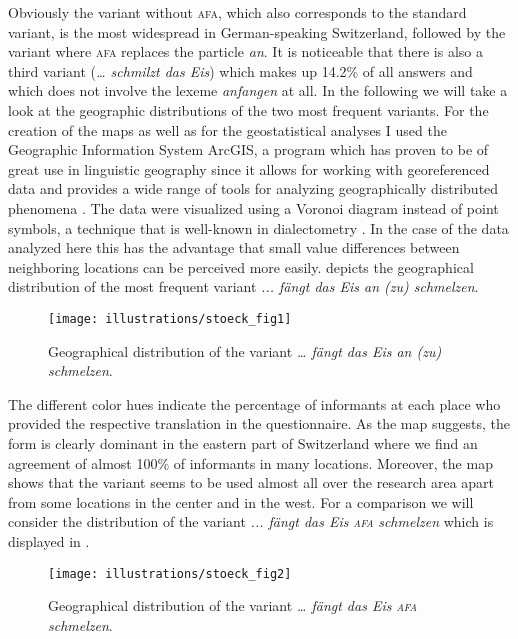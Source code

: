 \documentclass[output=paper]{LSP/langsci}
\begin{document}
Obviously the variant without \textsc{afa}, which also corresponds to the standard variant, is the most widespread in German-speaking Switzerland, followed by the variant where \textsc{afa }replaces the particle \emph{an}. It is noticeable that there is also a third variant (\emph{… schmilzt das Eis}) which makes up 14.2\% of all answers and which does not involve the lexeme \emph{anfangen} at all. In the following we will take a look at the geographic distributions of the two most frequent variants. For the creation of the maps as well as for the geostatistical analyses I used the Geographic Information System ArcGIS, a program which has proven to be of great use in linguistic geography since it allows for working with georeferenced data and provides a wide range of tools for analyzing geographically distributed phenomena \citep{montgomery_geographic_2013,stoeckle_subjektive_2014}. The data were visualized using a Voronoi diagram instead of point symbols, a technique that is well-known in dialectometry \citep{goebl_dialectometry_2010,nerbonne_mapping_2010}. In the case of the data analyzed here this has the advantage that small value differences between neighboring locations can be perceived more easily.  depicts the geographical distribution of the most frequent variant \emph{... fängt das Eis an (zu) schmelzen}.

\begin{figure}
\texttt{[image: illustrations/stoeck\_fig1]}
\label{fig:1}
\caption{Geographical distribution of the variant \emph{… fängt das Eis an (zu) schmelzen}.}
\end{figure}

The different color hues indicate the percentage of informants at each place who provided the respective translation in the questionnaire. As the map suggests, the form is clearly dominant in the eastern part of Switzerland where we find an agreement of almost 100\% of informants in many locations. Moreover, the map shows that the variant seems to be used almost all over the research area apart from some locations in the center and in the west. For a comparison we will consider the distribution of the variant \emph{... fängt das Eis }\emph{\textsc{afa}}\emph{ schmelzen} which is displayed in .

  
\begin{figure}
\texttt{[image: illustrations/stoeck\_fig2]}
\label{fig:2}
\caption{Geographical distribution of the variant \emph{… fängt das Eis \textsc{afa} schmelzen}.}
\end{figure}
 
\end{document}
